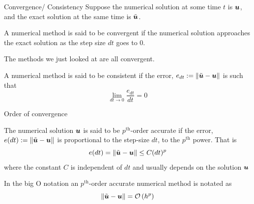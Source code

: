 \documentclass[presentation]{beamer}
\newcommand{\gv}[1]{\ensuremath{\mbox{\boldmath$ #1 $}}}
\newcommand{\order}[1]{\mathcal O \left( #1 \right)} %
\begin{document}
\begin{frame}[label={sec:orgd91ace2}]{Convergence/ Consistency}
Suppose the numerical solution at some time \(t\) is \(\gv{u}\), and the
exact solution at the same time is \(\tilde{\gv{u}}\).
\begin{definition}[Convergence]
A numerical method is said to be convergent if the numerical solution
approaches the exact solution as the step size \(dt\) goes to 0.
\end{definition}
The methods we just looked at are all convergent.
\begin{definition}[Consistency]
A numerical method is said to be consistent if the error, \(e_{dt}:=\lVert\tilde{\gv{u}}-\gv{u} \rVert\) is such that
\[ \lim_{dt \to 0} \frac{e_{dt}}{dt} = 0\]
\end{definition}
\end{frame}
\begin{frame}[label={sec:orgccd1dd3}]{Order of convergence}
\begin{definition}
The numerical solution \(\gv{u}\) is said to be \(p^{\text{th}}\)-order
accurate if the error, \(e(dt):=\lVert\tilde{\gv{u}}-\gv{u} \rVert\)
is proportional to the step-size \(dt\), to the \(p^{\text{th}}\) power. That
is
\[ e(dt)=\lVert\tilde{\gv{u}}-\gv{u} \rVert\leq C(dt)^{p} \]
where the constant \(C\) is independent of \(dt\) and usually depends on
the solution \(\gv{u}\)
\end{definition}
 In the big O notation an \(p^{\text{th}}\)-order accurate numerical method
 is notated as
\[ \lVert\tilde{\gv{u}}-\gv{u} \rVert = \order{h^p}\]
\end{frame}
\end{document}
